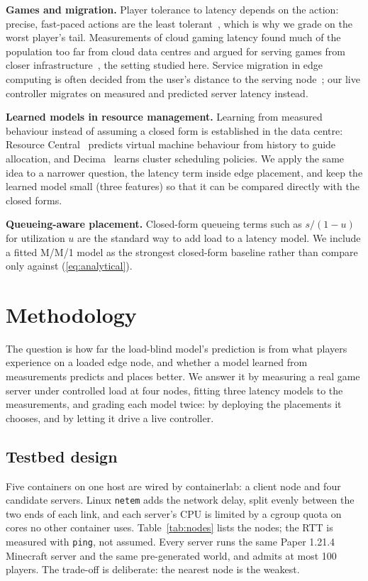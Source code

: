 \documentclass[conference]{IEEEtran}
\begin{document}
\textbf{Games and migration.} Player tolerance to latency depends on the
action: precise, fast-paced actions are the least tolerant~\cite{claypool2006latency},
which is why we grade on the worst player's tail. Measurements of cloud gaming
latency found much of the population too far from cloud data centres and
argued for serving games from closer infrastructure~\cite{choy2012brewing},
the setting studied here. Service migration in edge computing is often
decided from the user's distance to the serving node~\cite{wang2019migration};
our live controller migrates on measured and predicted server latency
instead.

\textbf{Learned models in resource management.} Learning from measured
behaviour instead of assuming a closed form is established in the data
centre: Resource Central~\cite{cortez2017resourcecentral} predicts virtual
machine behaviour from history to guide allocation, and
Decima~\cite{mao2019decima} learns cluster scheduling policies. We apply the
same idea to a narrower question, the latency term inside edge placement,
and keep the learned model small (three features) so that it can be
compared directly with the closed forms.

\textbf{Queueing-aware placement.} Closed-form queueing terms such as
$s/(1-u)$ for utilization $u$ are the standard way to add load to a latency
model. We include a fitted M/M/1 model as the strongest closed-form baseline
rather than compare only against (\ref{eq:analytical}).

\section{Methodology}

The question is how far the load-blind model's prediction is from what
players experience on a loaded edge node, and whether a model learned from
measurements predicts and places better. We answer it by measuring a real
game server under controlled load at four nodes, fitting three latency
models to the measurements, and grading each model twice: by deploying the
placements it chooses, and by letting it drive a live controller.

\subsection{Testbed design}
Five containers on one host are wired by containerlab: a client node and four
candidate servers. Linux \texttt{netem} adds the network delay, split evenly
between the two ends of each link, and each server's CPU is limited by a
cgroup quota on cores no other container uses. Table~\ref{tab:nodes} lists the nodes; the RTT is
measured with \texttt{ping}, not assumed. Every server runs the same Paper
1.21.4 Minecraft server and the same pre-generated world, and admits at most
100 players. The trade-off is
deliberate: the nearest node is the weakest.
\end{document}
